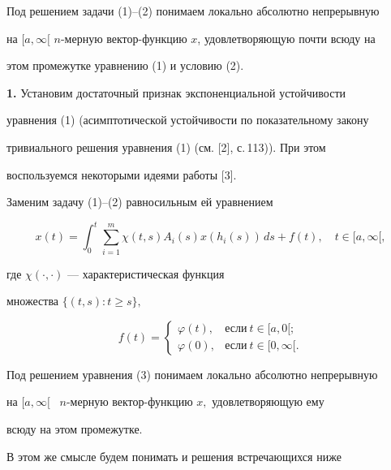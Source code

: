 Под решением задачи (1)--(2) понимаем локально абсолютно непрерывную


на $[a,\infty[$ $n$-мер\-ную вектор-функцию $x$, удовлетворяющую почти всюду на


этом промежутке уравнению  (1) и условию (2).





{\bf 1.} Установим  достаточный признак экспоненциальной устойчивости 


уравнения (1) (асимптотической устойчивости по показательному закону 


тривиального решения уравнения (1) (см. [2], с.\,113)). При этом  


воспользуемся некоторыми идеями работы [3].





Заменим задачу (1)--(2) равносильным ей уравнением


\begin{equation}


x(t)=\int_0^t\sum\limits_{i=1}^m \chi(t,s)A_i(s)x(h_i(s))\,ds+f(t),


\quad t\in [a,\infty[,


\end{equation}


где $\chi(\cdot,\cdot)$ --- характеристическая функция 


множества $\{(t,s):t\ge s\},$


$$


f(t)=


\begin{cases}


\varphi(t), & \text{если}\ t\in[a,0[;\\


\varphi(0), & \text{если}\ t\in[0,\infty[.


\end{cases}


$$





Под решением уравнения (3)  понимаем локально абсолютно непрерывную


на $[a,\infty[$ \ $n$-мер\-ную вектор-функцию $x,$ удовлетворяющую ему  


всюду на этом промежутке.





В этом же смысле будем понимать и решения встречающихся ниже 


